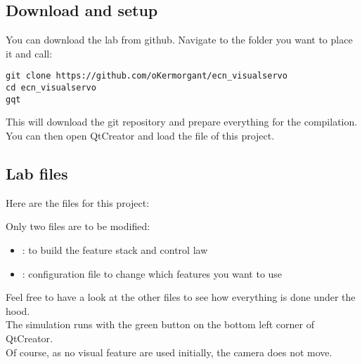\documentclass{ecnreport}
\begin{document}
\subsection{Download and setup}

You can download the lab from github. Navigate to the folder you want to place it and call:
\begin{center}\bashstyle
\begin{lstlisting}
git clone https://github.com/oKermorgant/ecn_visualservo
cd ecn_visualservo
gqt
\end{lstlisting}
\end{center}

This will download the git repository and prepare everything for the compilation.\\
You can then open QtCreator and load the  file of this project.

\subsection{Lab files}

Here are the files for this project:

\begin{center}
\begin{minipage}{.4\linewidth}
\end{minipage}
\begin{minipage}{.55\linewidth}
 Only two files are to be modified:
 \begin{itemize}
  \item {}: to build the feature stack and control law
  \item {}: configuration file to change which features you want to use
 \end{itemize}
\end{minipage}
\end{center}

Feel free to have a look at the other files to see how everything is done under the hood.\\

The simulation runs with the green  button on the bottom left corner of QtCreator.\\
Of course, as no visual feature are used initially, the camera does not move.
\end{document}
